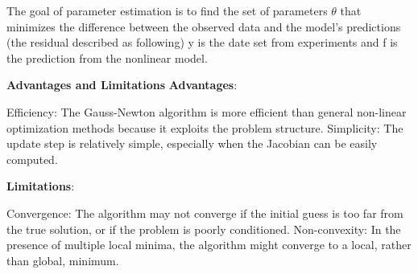 \documentclass[a4paper,11pt]{article} %
\begin{document}
The goal of parameter estimation is to find the set of parameters 
$\theta$ that minimizes the difference between the observed data and the model's predictions (the residual described as following)
y is the date set from experiments and f is the prediction from the nonlinear model.

\textbf{Advantages and Limitations}
\textbf{Advantages}:

Efficiency: The Gauss-Newton algorithm is more efficient than general non-linear optimization methods because it exploits the problem structure.
Simplicity: The update step is relatively simple, especially when the Jacobian can be easily computed.

\textbf{Limitations}:

Convergence: The algorithm may not converge if the initial guess is too far from the true solution, or if the problem is poorly conditioned.
Non-convexity: In the presence of multiple local minima, the algorithm might converge to a local, rather than global, minimum.
\end{document}
